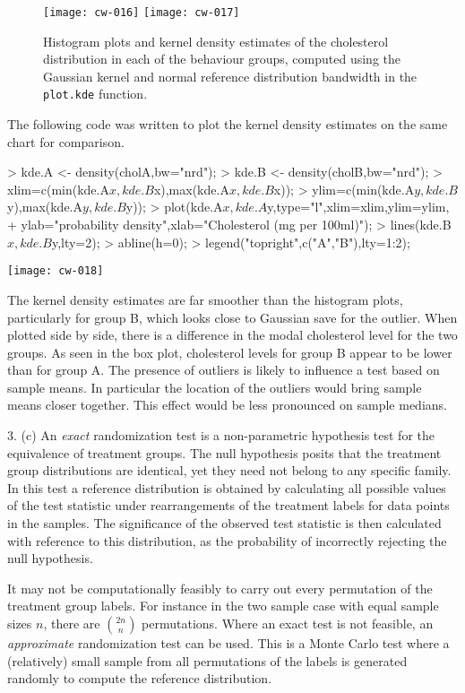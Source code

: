 \documentclass[a4paper,11pt]{article}
\begin{document}
\begin{figure}[h]
  \begin{center}
\texttt{[image: cw-016]}
\texttt{[image: cw-017]}
\caption{Histogram plots and kernel density estimates of the
  cholesterol distribution in each of the behaviour groups, computed
  using the Gaussian kernel and normal reference distribution
  bandwidth in the \texttt{plot.kde} function.}
\label{fig:kdehist}
\end{center}
\end{figure}

The following code was written to plot the kernel density estimates on
the same chart for comparison.
\begin{Schunk}
\begin{Sinput}
> kde.A <- density(cholA,bw="nrd");
> kde.B <- density(cholB,bw="nrd");
> xlim=c(min(kde.A$x,kde.B$x),max(kde.A$x,kde.B$x));
> ylim=c(min(kde.A$y,kde.B$y),max(kde.A$y,kde.B$y));
> plot(kde.A$x,kde.A$y,type="l",xlim=xlim,ylim=ylim,
+      ylab="probability density",xlab="Cholesterol (mg per 100ml)");
> lines(kde.B$x,kde.B$y,lty=2);
> abline(h=0);
> legend("topright",c("A","B"),lty=1:2);
\end{Sinput}
\end{Schunk}
\texttt{[image: cw-018]}

The kernel density estimates are far smoother than the histogram
plots, particularly for group B, which looks close to Gaussian save
for the outlier. When plotted side by side, there is a difference in
the modal cholesterol level for the two groups. As seen in the box
plot, cholesterol levels for group B appear to be lower than for group
A. The presence of outliers is likely to influence a test based on
sample means. In particular the location of the outliers would bring
sample means closer together. This effect would be less pronounced on
sample medians.

3. (c) An {\em exact} randomization test is a non-parametric hypothesis test
for the equivalence of treatment groups. The null hypothesis posits
that the treatment group distributions are identical, yet they need
not belong to any specific family. In this test a reference distribution
is obtained by calculating all possible values of the test statistic
under rearrangements of the treatment labels for data points in the
samples. The significance of the observed test statistic is then
calculated with reference to this distribution, as the probability of
incorrectly rejecting the null hypothesis.

It may not be computationally feasibly to carry out every permutation of the
treatment group labels. For instance in the two sample case with equal sample
sizes $n$, there are $\binom{2n}{n}$ permutations. Where an exact
test is not feasible, an {\em approximate} randomization test can be
used. This is a Monte Carlo test where  a (relatively) small sample
from all permutations of the labels is generated randomly to compute the
reference distribution.
\end{document}
